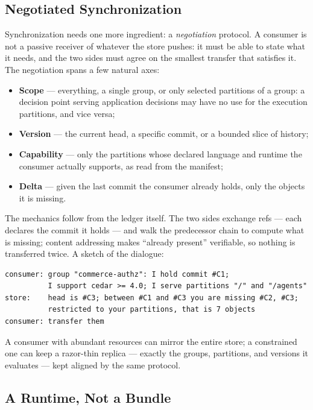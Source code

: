 \documentclass[11pt,a4paper]{article}
\newcommand{\term}[1]{\emph{#1}}                 %
\begin{document}
\subsection{Negotiated Synchronization}

Synchronization needs one more ingredient: a \term{negotiation} protocol.
A consumer is not a passive receiver of whatever the store pushes: it
must be able to state what it needs, and the two sides must agree on the
smallest transfer that satisfies it. The negotiation spans a few natural
axes:

\begin{itemize}[nosep]
  \item \textbf{Scope} --- everything, a single group, or only selected
        partitions of a group: a decision point serving application
        decisions may have no use for the execution partitions, and vice
        versa;
  \item \textbf{Version} --- the current head, a specific commit, or a
        bounded slice of history;
  \item \textbf{Capability} --- only the partitions whose declared
        language and runtime the consumer actually supports, as read from
        the manifest;
  \item \textbf{Delta} --- given the last commit the consumer already
        holds, only the objects it is missing.
\end{itemize}

The mechanics follow from the ledger itself. The two sides exchange refs
--- each declares the commit it holds --- and walk the predecessor chain
to compute what is missing; content addressing makes ``already present''
verifiable, so nothing is transferred twice. A sketch of the dialogue:

\begin{lstlisting}
consumer: group "commerce-authz": I hold commit #C1;
          I support cedar >= 4.0; I serve partitions "/" and "/agents"
store:    head is #C3; between #C1 and #C3 you are missing #C2, #C3;
          restricted to your partitions, that is 7 objects
consumer: transfer them
\end{lstlisting}

A consumer with abundant resources can mirror the entire store; a
constrained one can keep a razor-thin replica --- exactly the groups,
partitions, and versions it evaluates --- kept aligned by the same
protocol.

\subsection{A Runtime, Not a Bundle}
\end{document}
